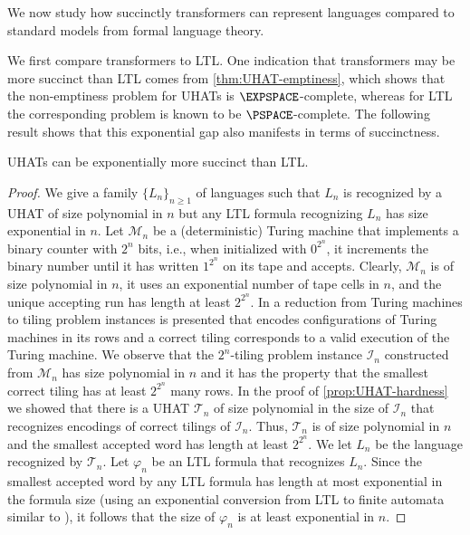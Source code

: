 We now study how succinctly transformers can represent languages compared to standard models from formal language theory.

We first compare transformers to LTL.
One indication that transformers may be more succinct than LTL comes from \cref{thm:UHAT-emptiness},
which shows that the non-emptiness problem for UHATs is $\EXPSPACE$-complete, 
whereas for LTL the corresponding problem is known to be $\PSPACE$-complete.
The following result shows that this exponential gap also manifests in terms of succinctness.

\begin{theorem}\label{thm:ltl-succinct}
UHATs can be exponentially more succinct than LTL.
\end{theorem}
\begin{proof}
We give a family $\{L_n\}_{n \ge 1}$ of languages such that $L_n$ is recognized by a UHAT of size polynomial in $n$
but any LTL formula recognizing $L_n$ has size exponential in $n$.
Let $\mathcal{M}_n$ be a (deterministic) Turing machine that implements a binary counter with $2^n$ bits,
i.e., when initialized with $0^{2^n}$, it increments the binary number until it has written $1^{2^n}$ on its tape and accepts.
Clearly, $\mathcal{M}_n$ is of size polynomial in $n$, 
it uses an exponential number of tape cells in $n$, and the unique accepting run has length at least $2^{2^n}$.
In \citep{Boas97} a reduction from Turing machines to tiling problem instances is presented 
that encodes configurations of Turing machines in its rows and 
a correct tiling corresponds to a valid execution of the Turing machine.
We observe that the $2^n$-tiling problem instance $\mathcal{I}_n$ constructed from $\mathcal{M}_n$ has size polynomial in $n$ 
and it has the property that the smallest correct tiling has at least $2^{2^n}$ many rows.
In the proof of \cref{prop:UHAT-hardness} we showed 
that there is a UHAT $\mathcal{T}_n$ of size polynomial in the size of $\mathcal{I}_n$ 
that recognizes encodings of correct tilings of $\mathcal{I}_n$.
Thus, $\mathcal{T}_n$ is of size polynomial in $n$ and the smallest accepted word has length at least $2^{2^n}$.
We let $L_n$ be the language recognized by $\mathcal{T}_n$.
Let $\varphi_n$ be an LTL formula that recognizes $L_n$.
Since the smallest accepted word by any LTL formula has length at most exponential in the formula size
(using an exponential conversion from LTL to finite automata similar to \citep{VardiW94}),
it follows that the size of $\varphi_n$ is at least exponential in $n$.
\end{proof}

